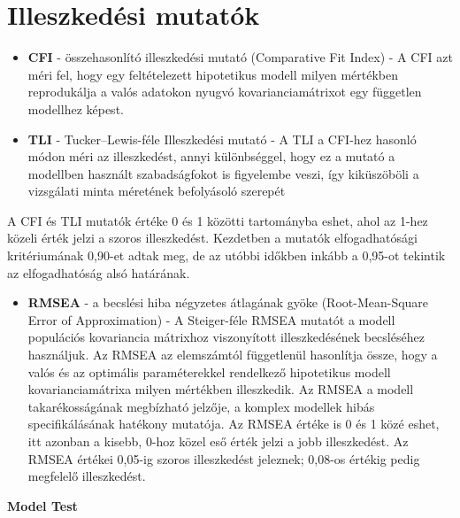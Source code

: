 \documentclass[
  letterpaper,
]{krantz}
\providecommand{\tightlist}{%
  \setlength{\itemsep}{0pt}\setlength{\parskip}{0pt}}\usepackage{longtable,booktabs,array}
\begin{document}
\hypertarget{illeszkeduxe9si-mutatuxf3k}{%
\section{Illeszkedési mutatók}\label{illeszkeduxe9si-mutatuxf3k}}

\begin{itemize}
\item
  \textbf{CFI} - összehasonlító illeszkedési mutató (Comparative Fit
  Index) - A CFI azt méri fel, hogy egy feltételezett hipotetikus modell
  milyen mértékben reprodukálja a valós adatokon nyugvó
  kovarianciamátrixot egy független modellhez képest.
\item
  \textbf{TLI} - Tucker--Lewis-féle Illeszkedési mutató - A TLI a
  CFI-hez hasonló módon méri az illeszkedést, annyi különbséggel, hogy
  ez a mutató a modellben használt szabadságfokot is figyelembe veszi,
  így kiküszöböli a vizsgálati minta méretének befolyásoló szerepét
\end{itemize}

A CFI és TLI mutatók értéke 0 és 1 közötti tartományba eshet, ahol az
1-hez közeli érték jelzi a szoros illeszkedést. Kezdetben a mutatók
elfogadhatósági kritériumának 0,90-et adtak meg, de az utóbbi időkben
inkább a 0,95-ot tekintik az elfogadhatóság alsó határának.

\begin{itemize}
\tightlist
\item
  \textbf{RMSEA} - a becslési hiba négyzetes átlagának gyöke
  (Root-Mean-Square Error of Approximation) - A Steiger-féle RMSEA
  mutatót a modell populációs kovariancia mátrixhoz viszonyított
  illeszkedésének becsléséhez használjuk. Az RMSEA az elemszámtól
  függetlenül hasonlítja össze, hogy a valós és az optimális
  paraméterekkel rendelkező hipotetikus modell kovarianciamátrixa milyen
  mértékben illeszkedik. Az RMSEA a modell takarékosságának megbízható
  jelzője, a komplex modellek hibás specifikálásának hatékony mutatója.
  Az RMSEA értéke is 0 és 1 közé eshet, itt azonban a kisebb, 0-hoz
  közel eső érték jelzi a jobb illeszkedést. Az RMSEA értékei 0,05-ig
  szoros illeszkedést jeleznek; 0,08-os értékig pedig megfelelő
  illeszkedést.
\end{itemize}

\textbf{Model Test}
\end{document}
